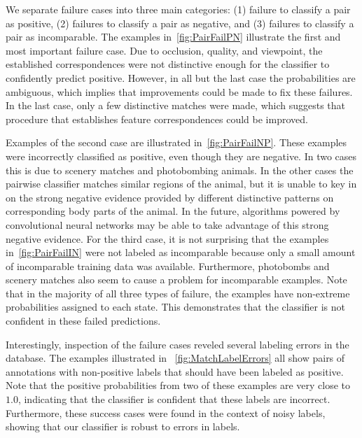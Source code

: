         We separate failure cases into three main categories:
        (1) failure to classify a pair as positive,
        (2) failures to classify a pair as negative, and
        (3) failures to classify a pair as incomparable.
        The examples in~\cref{fig:PairFailPN} illustrate the first and most important failure case.
        Due to occlusion, quality, and viewpoint, the established correspondences were not distinctive enough for
          the classifier to confidently predict positive.
        However, in all but the last case the probabilities are ambiguous, which implies that improvements could
          be made to fix these failures.
        In the last case, only a few distinctive matches were made, which suggests that procedure that
          establishes feature correspondences could be improved.

        Examples of the second case are illustrated in~\cref{fig:PairFailNP}.
        These examples were incorrectly classified as positive, even though they are negative.
        In two cases this is due to scenery matches and photobombing animals.
        In the other cases the pairwise classifier matches similar regions of the animal, but it is unable to key
          in on the strong negative evidence provided by different distinctive patterns on corresponding body parts
          of the animal.
        In the future, algorithms powered by convolutional neural networks may be able to take advantage of this
          strong negative evidence.
        For the third case, it is not surprising that the examples in~\cref{fig:PairFailIN} were not labeled as
          incomparable because only a small amount of incomparable training data was available.
        Furthermore, photobombs and scenery matches also seem to cause a problem for incomparable examples.
        Note that in the majority of all three types of failure, the examples have non-extreme probabilities
          assigned to each state.
        This demonstrates that the classifier is not confident in these failed predictions.

        Interestingly, inspection of the failure cases reveled several labeling errors in the database.
        The examples illustrated in ~\cref{fig:MatchLabelErrors} all show pairs of annotations with non-positive
          labels that should have been labeled as positive.
        Note that the positive probabilities from two of these examples are very close to $1.0$, indicating that
          the classifier is confident that these \groundtruth{} labels are incorrect.
        Furthermore, these success cases were found in the context of noisy \groundtruth{} labels, showing that our
          classifier is robust to errors in \groundtruth{} labels.

